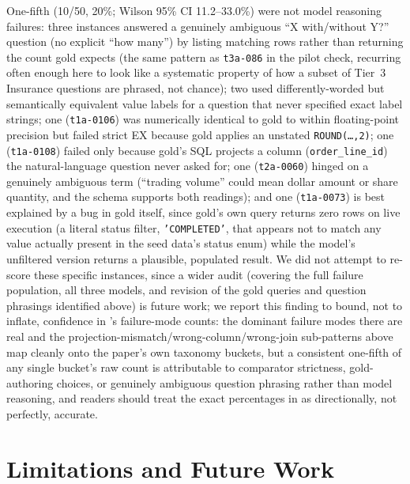 \documentclass[twocolumn]{svjour3}
\begin{document}
One-fifth (10/50, 20\%; Wilson 95\% CI 11.2--33.0\%) were not model reasoning failures: three instances answered a genuinely ambiguous ``X with/without Y?'' question (no explicit ``how many'') by listing matching rows rather than returning the count gold expects (the same pattern as \texttt{t3a-086} in the pilot check, recurring often enough here to look like a systematic property of how a subset of Tier~3 Insurance questions are phrased, not chance); two used differently-worded but semantically equivalent value labels for a question that never specified exact label strings; one (\texttt{t1a-0106}) was numerically identical to gold to within floating-point precision but failed strict EX because gold applies an unstated \texttt{ROUND(\ldots,2)}; one (\texttt{t1a-0108}) failed only because gold's SQL projects a column (\texttt{order\_line\_id}) the natural-language question never asked for; one (\texttt{t2a-0060}) hinged on a genuinely ambiguous term (``trading volume'' could mean dollar amount or share quantity, and the schema supports both readings); and one (\texttt{t1a-0073}) is best explained by a bug in gold itself, since gold's own query returns zero rows on live execution (a literal status filter, \texttt{'COMPLETED'}, that appears not to match any value actually present in the seed data's status enum) while the model's unfiltered version returns a plausible, populated result.
We did not attempt to re-score these specific instances, since a wider audit (covering the full failure population, all three models, and revision of the gold queries and question phrasings identified above) is future work; we report this finding to bound, not to inflate, confidence in 's failure-mode counts: the dominant failure modes there are real and the projection-mismatch/wrong-column/wrong-join sub-patterns above map cleanly onto the paper's own taxonomy buckets, but a consistent one-fifth of any single bucket's raw count is attributable to comparator strictness, gold-authoring choices, or genuinely ambiguous question phrasing rather than model reasoning, and readers should treat the exact percentages in  as directionally, not perfectly, accurate.

\section{Limitations and Future Work}
\label{sec:limits}
\end{document}
